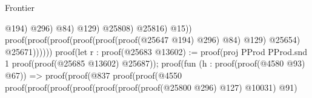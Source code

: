 \begin{lexlean}{Frontier}
\begin{coremodule}
                                                                                              @194)
                                                                                            @296)
                                                                                          @84)
                                                                                        @129)
                                                                                      @25808)
                                                                                    @25816)
                                                                                  @15))
                                                                            proof(proof(proof(proof(proof(proof(@25647
                                                                                          @194)
                                                                                        @296)
                                                                                      @84)
                                                                                    @129)
                                                                                  @25654)
                                                                                @25671))))))
                                                                proof(let r : proof(@25683
                                                                      @13602) := proof(proj PProd PProd.snd 1
                                                                    proof(proof(@25685 @13602)
                                                                        @25687));
                                                                  proof(fun (h : proof(proof(@4580
                                                                          @93)
                                                                        @67)) =>
                                                                    proof(proof(@837
                                                                          proof(proof(@4550
                                                                                proof(proof(proof(proof(proof(proof(proof(@25800
                                                                                                @296)
                                                                                              @127)
                                                                                            @10031)
                                                                                          @91)

\end{coremodule}
\end{lexlean}
